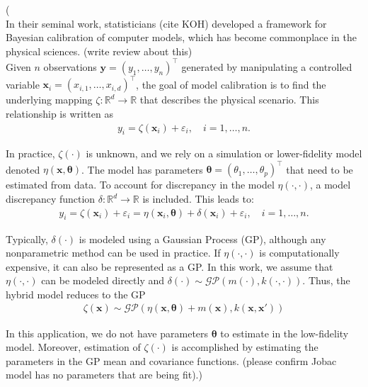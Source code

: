 \documentclass[journal=jacsat,manuscript=article]{achemso}
\newcommand{\kjnote}[1]{{\color{blue} (#1)}}
\newcommand{\kjtodo}[1]{{\color{red} (#1)}}
\newcommand{\alltodo}[1]{{\color{cyan} (#1)}}
\newcommand{\xvec}{\ensuremath{\mathbf{x}}}
\begin{document}
\kjnote{\\
In their seminal work, statisticians \kjtodo{cite KOH} developed a framework for Bayesian calibration of computer models, which has become commonplace in the physical sciences. \kjtodo{write review about this}\\

Given $n$ observations $\mathbf{y}=(y_1,\dots,y_n)^\intercal$ generated by manipulating a controlled variable $\xvec_i = (x_{i,1},\dots,x_{i,d})^\intercal$, the goal of model calibration is to find the underlying mapping $\zeta: \mathbb{R}^d \rightarrow \mathbb{R}$ that describes the physical scenario. This relationship is written as
\begin{gather}
    y_i = \zeta(\mathbf{x}_i) + \varepsilon_i, \quad i = 1,\dots,n. \label{eq: trueprocess}
\end{gather}

In practice, $\zeta(\cdot)$ is unknown, and we rely on a simulation or lower-fidelity model denoted $\eta(\mathbf{x}, \boldsymbol{\theta})$. The model has parameters $\boldsymbol{\theta}=(\theta_1,\dots,\theta_p)^\intercal$ that need to be estimated from data. To account for discrepancy in the model $\eta(\cdot,\cdot)$, a model discrepancy function $\delta: \mathbb{R}^d \rightarrow \mathbb{R}$ is included. This leads to:
\begin{gather}
     y_i = \zeta(\mathbf{x}_i) + \varepsilon_i = \eta(\mathbf{x}_i,\boldsymbol{\theta}) + \delta(\mathbf{x}_i) + \varepsilon_i, \quad i = 1,\dots,n.
\end{gather}

Typically, $\delta(\cdot)$ is modeled using a Gaussian Process (GP), although any nonparametric method can be used in practice. If $\eta(\cdot,\cdot)$ is computationally expensive, it can also be represented as a GP. In this work, we assume that $\eta(\cdot,\cdot)$ can be modeled directly and $\delta(\cdot)\sim \mathcal{GP}(m(\cdot),k(\cdot,\cdot))$. Thus, the hybrid model reduces to the GP
\begin{gather}
    \zeta(\mathbf{x}) \sim \mathcal{GP}(\eta(\mathbf{x},\boldsymbol{\theta}) + m(\mathbf{x}), k(\mathbf{x}, \mathbf{x}'))
\end{gather}

In this application, we do not have parameters $\boldsymbol{\theta}$ to estimate in the low-fidelity model. Moreover, estimation of $\zeta(\cdot)$ is accomplished by estimating the parameters in the GP mean and covariance functions.
\alltodo{please confirm Jobac model has no parameters that are being fit}.}
\end{document}

